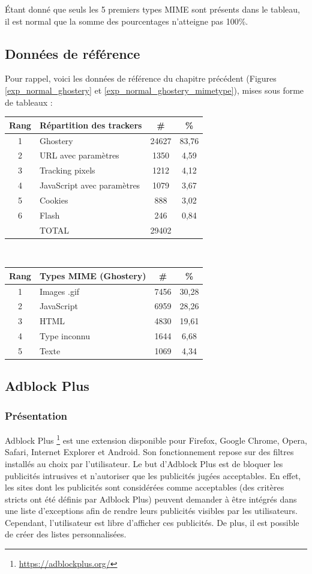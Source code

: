 Étant donné que seuls les 5 premiers types MIME sont présents dans le tableau, il est normal que la somme des pourcentages n'atteigne pas 100\%.
\newpage

\subsection{Données de référence}
Pour rappel, voici les données de référence du chapitre précédent (Figures \ref{exp_normal_ghostery} et \ref{exp_normal_ghostery_mimetype}), mises sous forme de tableaux :\\

\begin{tabular}{ c | p{5cm} | c | c | }
   Rang & Répartition des trackers & \# & \% \\
   \hline
   \hline
   1 & Ghostery & 24627 & 83,76 \\
   2 & URL avec paramètres & 1350 & 4,59 \\
   3 & Tracking pixels & 1212 & 4,12 \\
   4 & JavaScript avec paramètres & 1079 & 3,67 \\
   5 & Cookies & 888 & 3,02 \\
   6 & Flash & 246 & 0,84 \\
   \hline
    & TOTAL & 29402 \\
   \cline{1-3}
\end{tabular}
\\[1cm]

\begin{tabular}{ c | p{5cm} | c | c | }
   Rang & Types MIME (Ghostery) & \# & \% \\
   \hline
   \hline
   1 & Images .gif & 7456 & 30,28 \\
   2 & JavaScript & 6959 & 28,26 \\
   3 & HTML & 4830 & 19,61 \\
   4 & Type inconnu & 1644 & 6,68 \\
   5 & Texte & 1069 & 4,34 \\
   \hline
\end{tabular}

\subsection{Adblock Plus}
\subsubsection{Présentation}
Adblock Plus \footnote{\url{https://adblockplus.org/}} est une extension disponible pour Firefox, Google Chrome, Opera, Safari, Internet Explorer et Android. Son fonctionnement repose sur des filtres installés au choix par l'utilisateur. Le but d'Adblock Plus est de bloquer les publicités intrusives et n'autoriser que les publicités jugées acceptables. En effet, les sites dont les publicités sont considérées comme acceptables (des critères stricts ont été définis par Adblock Plus) peuvent demander à être intégrés dans une liste d'exceptions afin de rendre leurs publicités visibles par les utilisateurs. Cependant, l'utilisateur est libre d'afficher ces publicités. De plus, il est possible de créer des listes personnalisées.

